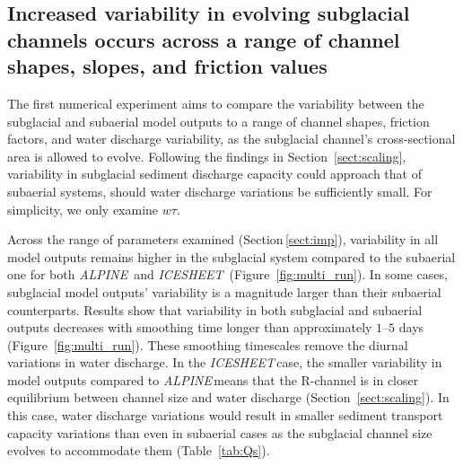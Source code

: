 \documentclass[esurf, manuscript]{copernicus}
\newcommand{\alpine}{\textit{ALPINE}\,}
\newcommand{\icesheet}{\textit{ICESHEET}\,}
\begin{document}
\FloatBarrier
\subsection{Increased variability in evolving subglacial channels occurs across a range of channel shapes, slopes,  and friction values}
\label{sect:ensemble}

The first numerical experiment aims to compare the variability between the subglacial and subaerial model outputs to a range of channel shapes, friction factors, and water discharge variability, as the subglacial channel's cross-sectional area is allowed to evolve.
Following the findings in Section~\ref{sect:scaling}, variability in subglacial sediment discharge capacity could approach that of subaerial systems, should water discharge variations be sufficiently small.
For simplicity, we only examine $w\tau$.


Across the range of parameters examined (Section\,\ref{sect:imp}), variability in all model outputs remains higher in the subglacial system compared to the subaerial one for both \alpine{} and \icesheet{} (Figure~\ref{fig:multi_run}).
In some cases, subglacial model outputs' variability is a magnitude larger than their subaerial counterparts.
Results show that variability in both subglacial and subaerial outputs decreases with smoothing time longer than approximately $1$--$5$ days (Figure~\ref{fig:multi_run}).
These smoothing timescales remove the diurnal variations in water discharge.
In the \icesheet case, the smaller variability in model outputs compared to \alpine means that the R-channel is in closer equilibrium between channel size and water discharge (Section~\ref{sect:scaling}).
In this case, water discharge variations would result in  smaller  sediment transport capacity variations than even in subaerial cases as the subglacial channel size evolves to accommodate them (Table~\ref{tab:Qs}).
\end{document}
